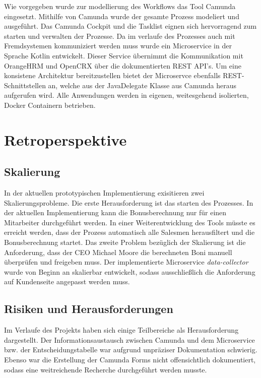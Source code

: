 \documentclass[]{article}
\begin{document}
Wie vorgegeben wurde zur modellierung des Workflows das Tool Camunda eingesetzt. Mithilfe von Camunda wurde der gesamte Prozess modeliert und ausgeführt. Das Camunda Cockpit und die Tasklist eignen sich hervorragend zum starten und verwalten der Prozesse. 
Da im verlaufe des Prozesses auch mit Fremdsystemen kommuniziert werden muss wurde ein Microservice in der Sprache Kotlin entwickelt. Dieser Service übernimmt die Kommunikation mit OrangeHRM und OpenCRX über die dokumentierten REST API's.
Um eine konsistene Architektur bereitzustellen bietet der Microservce ebenfalls REST-Schnittstellen an, welche aus der JavaDelegate Klasse aus Camunda heraus aufgerufen wird. 
Alle Anwendungen werden in eigenen, weitesgehend isolierten, Docker Containern betrieben.


\hypertarget{section-technical-risks}{%
\section{Retroperspektive}\label{section-technical-risks}}
\subsection{Skalierung}
In der aktuellen prototypischen Implementierung exisitieren zwei Skalierungsprobleme. Die erste Herausforderung ist das starten des Prozesses. In der aktuellen Implementierung kann die Bonusberechnung nur für einen Mitarbeiter durchgeführt werden. In einer Weiterentwicklung des Tools müsste es erreicht werden, dass der Prozess automatisch alle Salesmen herausfiltert und die Bonusberechnung startet. 
Das zweite Problem bezüglich der Skalierung ist die Anforderung, dass der CEO Michael Moore die berechneten Boni manuell überprüfen und freigeben muss. 
Der implementierte Microservice \emph{data-collector} wurde von Beginn an skalierbar entwickelt, sodass ausschließlich die Anforderung auf Kundenseite angepasst werden muss.

\subsection{Risiken und Herausforderungen}
Im Verlaufe des Projekts haben sich einige Teilbereiche als Herausforderung dargestellt. Der Informationsaustausch zwischen Camunda und dem Microservice bzw. der Entscheidungstabelle war aufgrund unpräziser Dokumentation schwierig. Ebenso war die Erstellung der Camunda Forms nicht offensichtlich dokumentiert, sodass eine weitreichende Recherche durchgeführt werden musste.
\end{document}
